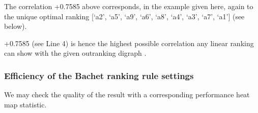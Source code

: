 \documentclass[a4paper,12pt,english]{sphinxhowto}
\begin{document}
\sphinxAtStartPar
The correlation +0.7585 above corresponds, in the example given here, again to the unique optimal  ranking {[}‘a2’, ‘a5’, ‘a9’, ‘a6’, ‘a8’, ‘a4’, ‘a3’, ‘a7’, ‘a1’{]} (see below).
\def\sphinxLiteralBlockLabel{\label{\detokenize{pearls:optimalkemeny1}}}
%
\begin{sphinxVerbatim}[commandchars=\\\{\},numbers=left,firstnumber=1,stepnumber=1]
 
\end{sphinxVerbatim}
\sphinxresetverbatimhllines

\sphinxAtStartPar
+0.7585 (see Line 4) is hence the highest possible correlation any linear ranking can show with the given outranking digraph .


\subsubsection{Efficiency of the Bachet ranking rule settings}
\label{\detokenize{pearls:efficiency-of-the-bachet-ranking-rule-settings}}
\sphinxAtStartPar
We may check the quality of the  result with a corresponding performance heat map statistic.

\begin{sphinxVerbatim}[commandchars=\\\{\},numbers=left,firstnumber=1,stepnumber=1]
           
\end{sphinxVerbatim}
\end{document}
